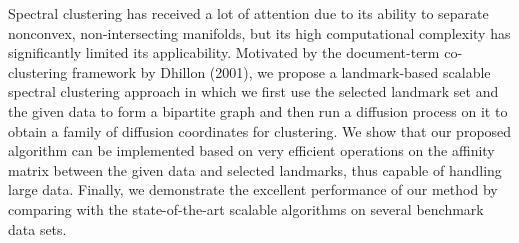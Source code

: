Spectral clustering has received a lot of attention due to its ability to separate nonconvex, non-intersecting manifolds, but its high computational complexity has significantly limited its applicability. Motivated by the document-term co-clustering framework by Dhillon (2001), we propose a landmark-based scalable spectral clustering approach in which we first use the selected landmark set and the given data to form a bipartite graph and then run a diffusion process on it to obtain a family of diffusion coordinates for clustering. We show that our proposed algorithm can be implemented based on very efficient operations on the affinity matrix between the given data and selected landmarks, thus capable of handling large data. Finally, we demonstrate the excellent performance of our method by comparing with the state-of-the-art scalable algorithms on several benchmark data sets.
